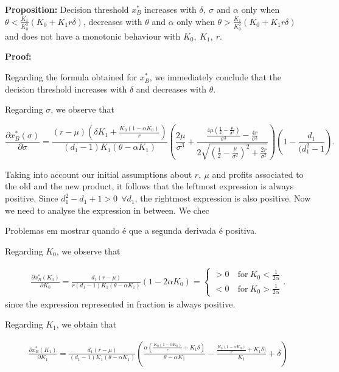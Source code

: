 \textbf{Proposition:}
Decision threshold $x^*_B$ increases with $ \delta, \ \sigma$ and $\alpha$ only when $\theta < \frac{K_1}{ K_0^2} (K_0+K_1 r \delta)$, decreases with $\theta$ and $\alpha$ only when $\theta > \frac{K_1}{ K_0^2} (K_0+K_1 r \delta)$ and does not have a monotonic behaviour with $K_0, \ K_1, \ r$.


\textbf{Proof:}

Regarding the formula obtained for  $x^*_B$, we immediately conclude that the decision threshold increases with $\delta$ and decreases with $\theta$.

Regarding $\sigma$, we observe that


$$    \frac{\partial x^*_B ( \sigma ) }{\partial \sigma}= 
\frac{(r-\mu )  \left(\delta  K_1+\frac{K_0(1-\alpha K_0)}{r}\right)}{(d_1-1) K_1 (\theta -\alpha  K_1)} \left(\frac{2 \mu }{\sigma ^3}+\frac{\frac{4 \mu  \left(\frac{1}{2}-\frac{\mu }{\sigma ^2}\right)}{\sigma ^3}-\frac{4 r}{\sigma ^3}}{2 \sqrt{\left(\frac{1}{2}-\frac{\mu }{\sigma ^2}\right)^2+\frac{2 r}{\sigma ^2}}}\right) \left( 1- \frac{d_1}{(d_1^2-1} \right).$$


Taking into account our initial assumptions about $r, \ \mu$ and profits associated to the old and the new product, it follows that the leftmost expression is always positive. Since $d_1^2-d_1+1>0 \ \ \forall d_1$, the rightmost expression is also positive. Now we need to analyse the expression in between. We chec

Problemas em mostrar quando é que a segunda derivada é positiva.

Regarding $K_0$, we observe that

\begin{align*}
\frac{\partial x^*_B ( K_0 ) }{\partial K_0}= 
\frac{d_1 (r-\mu )}{r (d_1-1)K_1(\theta-\alpha K_1)} (1-2\alpha K_0)
=
\begin{cases}
>0 &\ \text{for} \ K_0<\frac{1}{2 \alpha}\\
<0 &\ \text{for} \ K_0>\frac{1}{2 \alpha}
\end{cases}.
\end{align*}
since the expression represented in fraction is always positive.


Regarding $K_1$, we obtain that

\begin{align*}
\frac{\partial x^*_B ( K_1 ) }{\partial K_1}= 
\frac{d_1 (r-\mu )}{ (d_1-1)K_1(\theta-\alpha K_1)}  \left( \frac{\alpha (\frac{K_0(1-\alpha K_0)}{r}+K_1 \delta )}{\theta-\alpha K_1} -\frac{ \frac{K_0(1-\alpha K_0)}{r}+K_1 \delta )}{K_1}+ \delta \right)
\end{align*}



